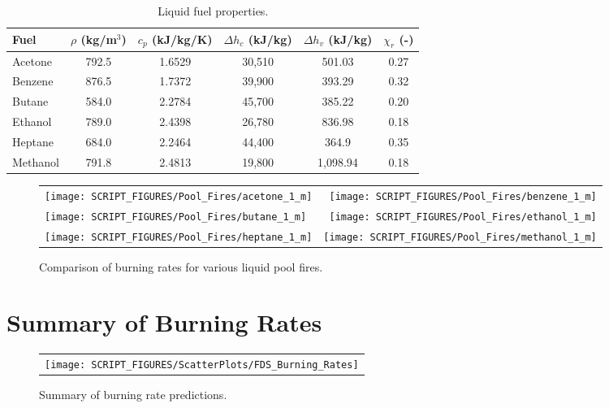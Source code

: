 \begin{table}[h!]
\begin{center}
\caption{Liquid fuel properties.}
\begin{tabular}{|l|c|c|c|c|c|} \hline
Fuel & $\rho$ (kg/m$^3$) & $c_p$ (kJ/kg/K)  & $\Delta h_c$ (kJ/kg) & $\Delta h_v$ (kJ/kg) & $\chi_r$ (-) \\ \hline \hline
Acetone &  792.5   &  1.6529    &   30,510  &  501.03   & 0.27  \\ \hline
Benzene &  876.5   &  1.7372    &   39,900  &   393.29  & 0.32  \\ \hline
Butane  &  584.0   &  2.2784    &   45,700  &   385.22  & 0.20  \\ \hline
Ethanol &  789.0   &  2.4398    &   26,780  &    836.98 & 0.18  \\ \hline
Heptane &  684.0   &  2.2464    &   44,400  &    364.9  & 0.35  \\ \hline
Methanol & 791.8   &  2.4813    &   19,800  &  1,098.94 & 0.18  \\ \hline
\end{tabular}
\end{center}
\end{table}

\newpage

\begin{figure}[p]
\begin{tabular*}{\textwidth}{l@{\extracolsep{\fill}}r}
\texttt{[image: SCRIPT\_FIGURES/Pool\_Fires/acetone\_1\_m]} &
\texttt{[image: SCRIPT\_FIGURES/Pool\_Fires/benzene\_1\_m]} \\
\texttt{[image: SCRIPT\_FIGURES/Pool\_Fires/butane\_1\_m]} &
\texttt{[image: SCRIPT\_FIGURES/Pool\_Fires/ethanol\_1\_m]} \\
\texttt{[image: SCRIPT\_FIGURES/Pool\_Fires/heptane\_1\_m]} &
\texttt{[image: SCRIPT\_FIGURES/Pool\_Fires/methanol\_1\_m]} \\
\end{tabular*}
\caption[Comparison of burning rates for various liquid pool fires.]{Comparison of burning rates for various liquid pool fires.}
\label{POOL_MLR}
\end{figure}

\clearpage

\section{Summary of Burning Rates}

\begin{figure}[ht]
\begin{center}
\begin{tabular}{c}
\texttt{[image: SCRIPT\_FIGURES/ScatterPlots/FDS\_Burning\_Rates]}
\end{tabular}
\end{center}
\caption[Summary of burning rate predictions]{Summary of burning rate predictions.}
\end{figure}




